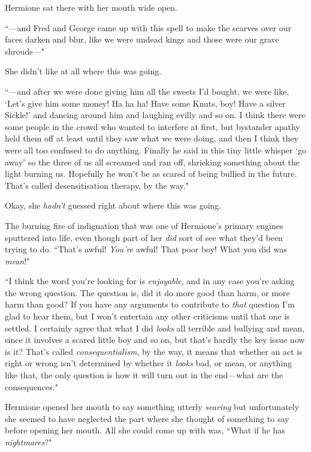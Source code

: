 Hermione sat there with her mouth wide open.

``—and Fred and George came up with this spell to make the scarves over our faces darken and blur, like we were undead kings and those were our grave shrouds—"

She didn't like at all where this was going.

``—and after we were done giving him all the sweets I'd bought, we were like, `Let's give him some money! Ha ha ha! Have some Knuts, boy! Have a silver Sickle!' and dancing around him and laughing evilly and so on. I think there were some people in the crowd who wanted to interfere at first, but bystander apathy held them off at least until they saw what we were doing, and then I think they were all too confused to do anything. Finally he said in this tiny little whisper `go away' so the three of us all screamed and ran off, shrieking something about the light burning us. Hopefully he won't be as scared of being bullied in the future. That's called desensitisation therapy, by the way."

Okay, she \emph{hadn't} guessed right about where this was going.

The burning fire of indignation that was one of Hermione's primary engines sputtered into life, even though part of her \emph{did} sort of see what they'd been trying to do. ``That's awful! \emph{You're} awful! That poor boy! What you did was \emph{mean}!"

``I think the word you're looking for is \emph{enjoyable}, and in any case you're asking the wrong question. The question is, did it do more good than harm, or more harm than good? If you have any arguments to contribute to \emph{that} question I'm glad to hear them, but I won't entertain any other criticisms until that one is settled. I certainly agree that what I did \emph{looks} all terrible and bullying and mean, since it involves a scared little boy and so on, but that's hardly the key issue now is it? That's called \emph{consequentialism}, by the way, it means that whether an act is right or wrong isn't determined by whether it \emph{looks} bad, or mean, or anything like that, the only question is how it will turn out in the end—what are the consequences."

Hermione opened her mouth to say something utterly \emph{searing} but unfortunately she seemed to have neglected the part where she thought of something to say before opening her mouth. All she could come up with was, ``What if he has \emph{nightmares}?"

